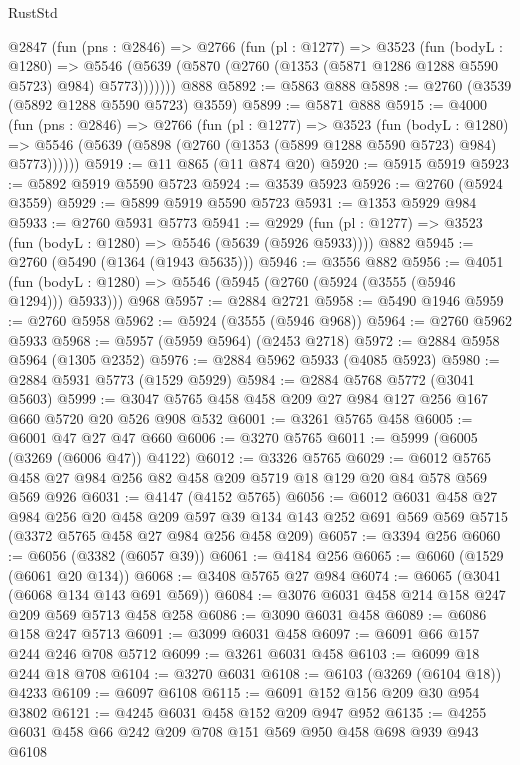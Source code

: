 \begin{lexlean}{RustStd}
\begin{coremodule}
    @2847
      (fun (pns : @2846) =>
      @2766
        (fun (pl : @1277) =>
        @3523
          (fun (bodyL : @1280) =>
          @5546 (@5639 (@5870 (@2760 (@1353 (@5871 @1286 @1288 @5590 @5723) @984) @5773)))))))
    @888
@5892 := @5863 @888
@5898 := @2760 (@3539 (@5892 @1288 @5590 @5723) @3559)
@5899 := @5871 @888
@5915 := @4000
    (fun (pns : @2846) =>
    @2766
      (fun (pl : @1277) =>
      @3523
        (fun (bodyL : @1280) =>
        @5546 (@5639 (@5898 (@2760 (@1353 (@5899 @1288 @5590 @5723) @984) @5773))))))
@5919 := @11 @865 (@11 @874 @20)
@5920 := @5915 @5919
@5923 := @5892 @5919 @5590 @5723
@5924 := @3539 @5923
@5926 := @2760 (@5924 @3559)
@5929 := @5899 @5919 @5590 @5723
@5931 := @1353 @5929 @984
@5933 := @2760 @5931 @5773
@5941 := @2929 (fun (pl : @1277) => @3523 (fun (bodyL : @1280) => @5546 (@5639 (@5926 @5933)))) @882
@5945 := @2760 (@5490 (@1364 (@1943 @5635)))
@5946 := @3556 @882
@5956 := @4051
    (fun (bodyL : @1280) => @5546 (@5945 (@2760 (@5924 (@3555 (@5946 @1294))) @5933)))
    @968
@5957 := @2884 @2721
@5958 := @5490 @1946
@5959 := @2760 @5958
@5962 := @5924 (@3555 (@5946 @968))
@5964 := @2760 @5962 @5933
@5968 := @5957 (@5959 @5964) (@2453 @2718)
@5972 := @2884 @5958 @5964 (@1305 @2352)
@5976 := @2884 @5962 @5933 (@4085 @5923)
@5980 := @2884 @5931 @5773 (@1529 @5929)
@5984 := @2884 @5768 @5772 (@3041 @5603)
@5999 := @3047 @5765 @458 @458 @209 @27 @984 @127 @256 @167 @660 @5720 @20 @526 @908 @532
@6001 := @3261 @5765 @458
@6005 := @6001 @47 @27 @47 @660
@6006 := @3270 @5765
@6011 := @5999 (@6005 (@3269 (@6006 @47)) @4122)
@6012 := @3326 @5765
@6029 := @6012 @5765 @458 @27 @984 @256 @82 @458 @209 @5719 @18 @129 @20 @84 @578 @569 @569 @926
@6031 := @4147 (@4152 @5765)
@6056 := @6012
    @6031
    @458
    @27
    @984
    @256
    @20
    @458
    @209
    @597
    @39
    @134
    @143
    @252
    @691
    @569
    @569
    @5715
    (@3372 @5765 @458 @27 @984 @256 @458 @209)
@6057 := @3394 @256
@6060 := @6056 (@3382 (@6057 @39))
@6061 := @4184 @256
@6065 := @6060 (@1529 (@6061 @20 @134))
@6068 := @3408 @5765 @27 @984
@6074 := @6065 (@3041 (@6068 @134 @143 @691 @569))
@6084 := @3076 @6031 @458 @214 @158 @247 @209 @569 @5713 @458 @258
@6086 := @3090 @6031 @458
@6089 := @6086 @158 @247 @5713
@6091 := @3099 @6031 @458
@6097 := @6091 @66 @157 @244 @246 @708 @5712
@6099 := @3261 @6031 @458
@6103 := @6099 @18 @244 @18 @708
@6104 := @3270 @6031
@6108 := @6103 (@3269 (@6104 @18)) @4233
@6109 := @6097 @6108
@6115 := @6091 @152 @156 @209 @30 @954 @3802
@6121 := @4245 @6031 @458 @152 @209 @947 @952
@6135 := @4255 @6031 @458 @66 @242 @209 @708 @151 @569 @950 @458 @698 @939 @943 @6108

\end{coremodule}
\end{lexlean}
